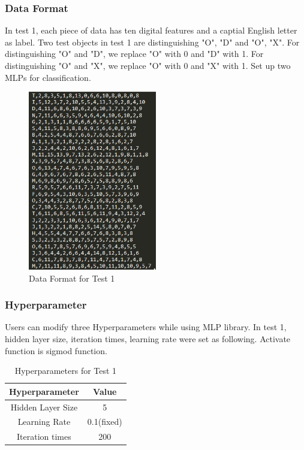 \documentclass[a4paper]{article}
\begin{document}
\subsubsection{Data Format}
In test 1, each piece of data has ten digital features and a captial English letter as label. Two test objects in test 1 are distinguishing "O", "D" and "O", "X". For distinguishing "O" and "D", we replace "O" with 0 and "D" with 1. For distinguishing "O" and "X", we replace "O" with 0 and "X" with 1. Set up two MLPs for classification.
\begin{figure}[H]
\centering
\includegraphics[width=0.5\textwidth]{data.png}
\caption{\label{fig:frog}Data Format for Test 1}
\end{figure}
\subsubsection{Hyperparameter}
Users can modify three Hyperparameters while using MLP library. In test 1, hidden layer size, iteration times, learning rate were set as following. Activate function is sigmod function.
\begin{table}[H]
\centering
\begin{tabular}{|c|c|}
 \hline
Hyperparameter& Value \\
 \hline
Hidden Layer Size & 5   \\
 \hline
Learning Rate& 0.1(fixed)\\
  \hline
Iteration times & 200\\
\hline
\end{tabular}\\
\caption{\label{tab:widgets}Hyperparameters for Test 1}
\end{table}
\end{document}
